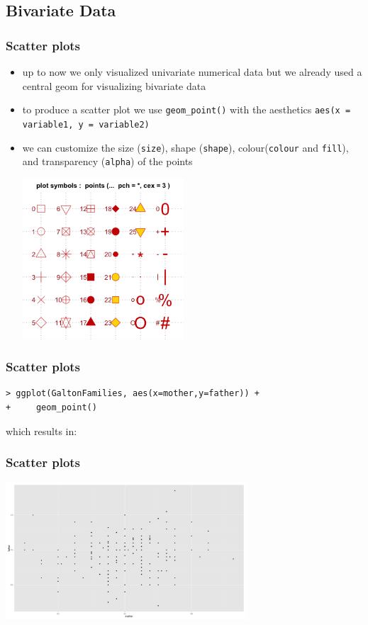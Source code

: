 \documentclass[xcolor={table}]{beamer}
\begin{document}
\subsection{Bivariate Data}
\begin{frame}\frametitle{Scatter plots}
  \begin{itemize}
  \item up to now we only visualized univariate numerical data but we already used a central geom for visualizing bivariate data 
  \item to produce a scatter plot we use \texttt{geom\_point()} with the aesthetics \texttt{aes(x = variable1, y = variable2)}
  \item we can customize the size (\texttt{size}), shape (\texttt{shape}), colour(\texttt{colour} and \texttt{fill}), and transparency (\texttt{alpha}) of the points 
  \begin{center}
    \includegraphics[width=6cm]{shapes.png}
  \end{center}
  \end{itemize}
\end{frame}

\begin{frame}[fragile]\frametitle{Scatter plots}
\small
\begin{verbatim}
> ggplot(GaltonFamilies, aes(x=mother,y=father)) +
+     geom_point()
\end{verbatim}
which results in:
\end{frame}


\begin{frame}\frametitle{Scatter plots}
  \begin{center}
    \includegraphics[width=9cm]{scatter.png}
  \end{center}
\end{frame}
\end{document}
